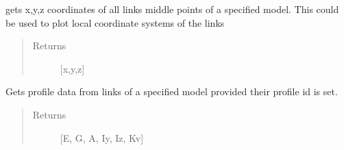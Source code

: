\documentclass[letterpaper,10pt,english]{sphinxmanual}
\begin{document}
\begin{fulllineitems}
\begin{fulllineitems}
\begin{quote}
\begin{description}
\end{description}\end{quote}

\end{fulllineitems}


\begin{fulllineitems}
\label{\detokenize{api:beamon.database.database.Database.get_links_middle_points}}
gets x,y,z coordinates of all links middle points of a specified model.
This could be used to plot local coordinate systems of the links
\begin{quote}\begin{description}
\item[{Returns}] \leavevmode
{[}x,y,z{]}

\end{description}\end{quote}

\end{fulllineitems}


\begin{fulllineitems}
\label{\detokenize{api:beamon.database.database.Database.get_links_profiles}}
Gets profile data from links of a specified model provided their profile id is set.
\begin{quote}\begin{description}
\item[{Returns}] \leavevmode
{[}E, G, A, Iy, Iz, Kv{]}

\end{description}\end{quote}

\end{fulllineitems}



\end{fulllineitems}
\end{document}
